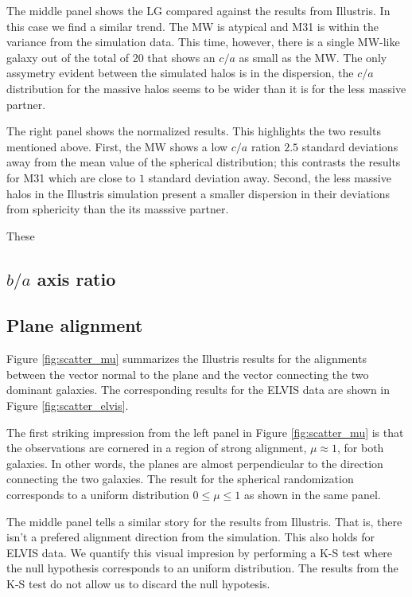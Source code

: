 \documentclass[a4paper,fleqn,usenatbib]{mnras}
\begin{document}
The middle panel shows the LG compared against the results from
Illustris. In this case we find a similar trend. The MW is atypical
and M31 is within the variance from the simulation data.
This time, however, there is a single MW-like galaxy out of the total
of 20 that shows an $c/a$ as small as the MW.
The only assymetry evident between the simulated halos is in the
dispersion, the $c/a$ distribution for the massive halos seems to be
wider than it is for the less massive partner. 

The right panel shows the normalized results. 
This highlights the two results mentioned above.
First, the MW shows a low $c/a$ ration $2.5$ standard deviations away
from the mean value of the spherical distribution; this contrasts the
results for M31 which are close to $1$ standard deviation away.
Second, the less massive halos in the Illustris simulation present a
smaller dispersion in their deviations from sphericity than the
its masssive partner.

These 

\subsection{$b/a$ axis ratio}

\subsection{Plane alignment}

Figure \ref{fig:scatter_mu} summarizes the Illustris results for the
alignments between the vector normal to the plane and the vector
connecting the two dominant galaxies.
The corresponding results for the ELVIS data are shown in Figure
\ref{fig:scatter_elvis}. 

The first striking impression from the left panel in Figure
\ref{fig:scatter_mu} is that the observations are cornered in
a region of strong alignment, $\mu\approx 1$, for both galaxies. 
In other words, the planes are almost perpendicular to the direction
connecting the two galaxies. 
The result for the spherical randomization corresponds to a uniform
distribution $0\leq \mu\leq 1$ as shown in the same panel.

The middle panel tells a similar story for the results from
Illustris. That is, there isn't a prefered alignment direction from
the simulation. This also holds for ELVIS data.
We quantify this visual impresion by performing a K-S test where the
null hypothesis corresponds to an uniform distribution. 
The results from the K-S test do not allow us to discard the null
hypotesis. 
\end{document}
